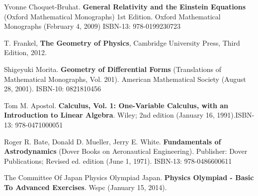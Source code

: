 \documentclass[10pt]{amsart}
\begin{document}
\begin{thebibliography}{9}
Yvonne Choquet-Bruhat.  \textbf{General Relativity and the Einstein Equations} (Oxford Mathematical Monographs) 1st Edition.  Oxford Mathematical Monographs (February 4, 2009) ISBN-13: 978-0199230723

T. Frankel,
\textbf{The Geometry of Physics}, 
Cambridge University Press, 
Third Edition,
2012.

Shigeyuki Morita. \textbf{Geometry of Differential Forms} (Translations of Mathematical Monographs, Vol. 201). American Mathematical Society (August 28, 2001). ISBN-10: 0821810456

Tom M. Apostol. \textbf{Calculus, Vol. 1: One-Variable Calculus, with an Introduction to Linear Algebra}. Wiley; 2nd edition (January 16, 1991).ISBN-13: 978-0471000051

Roger R. Bate, Donald D. Mueller, Jerry E. White. \textbf{Fundamentals of Astrodynamics} (Dover Books on Aeronautical Engineering). Publisher: Dover Publications; Revised ed. edition (June 1, 1971). ISBN-13: 978-0486600611

The Committee Of Japan Physics Olympiad Japan. \textbf{Physics Olympiad - Basic To Advanced Exercises}.
Wspc (January 15, 2014).


\end{thebibliography}
\end{document}
